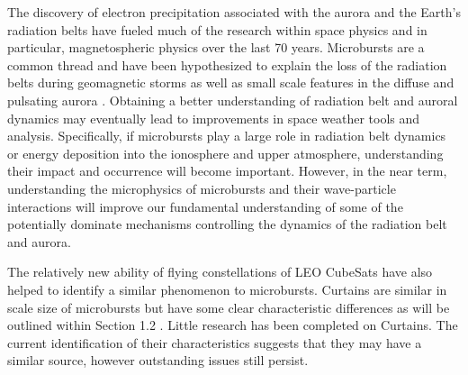 \documentclass[referee,a4paper,12pt,traditabstract]{swsc}
\begin{document}
\begin{linenumbers}


 The discovery of electron precipitation associated with the aurora and the Earth's radiation belts have fueled much of the research within space physics and in particular, magnetospheric physics over the last 70 years. Microbursts are a common thread and have been hypothesized to explain the loss of the radiation belts during geomagnetic storms as well as small scale features in the diffuse and pulsating aurora \citep[e.g.][and refrences therein]{Lorentzen2001, Miyoshi2015, Greeley2019}. Obtaining a better understanding of radiation belt and auroral dynamics may eventually lead to improvements in space weather tools and analysis. Specifically, if microbursts play a large role in radiation belt dynamics or energy deposition into the ionosphere and upper atmosphere, understanding their impact and occurrence will become important. However, in the near term, understanding the microphysics of microbursts and their wave-particle interactions will improve our fundamental understanding of some of the potentially dominate mechanisms controlling the dynamics of the radiation belt and aurora. 

The relatively new ability of flying constellations of LEO CubeSats have also helped to identify a similar phenomenon to microbursts. Curtains are similar in scale size of microbursts but have some clear characteristic differences as will be outlined within Section 1.2 \citep[][]{Blake2016}. Little research has been completed on Curtains. The current identification of their characteristics suggests that they may have a similar source, however outstanding issues still persist. 


\end{linenumbers}
\end{document}
